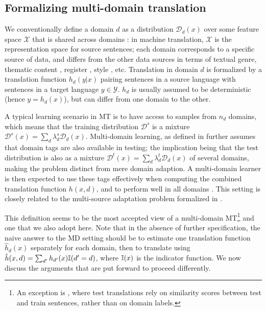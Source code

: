 \subsection{Formalizing multi-domain translation \label{ssec:formalization}}

We conventionally define a domain $d$ as a distribution $\mathcal{D}_d(x)$ over some feature space $\mathcal{X}$ that is shared across domains \cite{Pan10asurvey}: in machine translation, $\mathcal{X}$ is the representation space for source sentences; each domain corresponds to a specific source of data, and differs from the other data sources in terms of textual genre, thematic content \cite{Chen16guided,Zhang16topicinformed}, register \cite{Sennrich16politeness}, style \cite{Niu18multitask}, etc. Translation in domain $d$ is formalized by a translation function $h_d(y|x)$ pairing sentences in a source language with sentences in a target language $y \in \mathcal{Y}$. $h_d$ is usually assumed to be deterministic (hence $y = h_d(x)$), but can differ from one domain to the other.

A typical learning scenario in MT is to have access to samples from $n_d$ domains, which means that the training distribution $\mathcal{D}^s$ is a mixture $\mathcal{D}^s(x) = \sum_d \lambda^{s}_{d} \mathcal{D}_d(x)$. Multi-domain learning, as defined in \citet{Dredze08online} further assumes that domain tags are also available in testing; the implication being that the test distribution is also as a mixture $\mathcal{D}^t(x) = \sum_d \lambda^{t}_{d} \mathcal{D}_d(x)$ of several domains, making the problem distinct from mere domain adaption. A multi-domain learner is then expected to use these tags effectively \cite{Joshi12multidomain} when computing the combined translation function $h(x,d)$, and to perform well in all domains \cite{Finkel09hierarchical}. This setting is closely related to the multi-source adaptation problem formalized in \cite{Mansour09domain,Mansour09multiple,Hoffman18algorithms}.

This definition seems to be the most accepted view of a multi-domain MT\footnote{An exception is \citep{Farajian17multidomain}, where test translations rely on similarity scores between test and train sentences, rather than on domain labels.} and one that we also adopt here. Note that in the absence of further specification, the naive answer to the MD setting should be to estimate one translation function $\hat{h}_d(x)$ separately for each domain, then to translate using $\hat{h}(x,d) = \sum_{d'} h_{d'}(x) \mathbb{I}(d' = d)$, where $\mathbb{I}(x)$ is the indicator function. We now discuss the arguments that are put forward to proceed differently.


